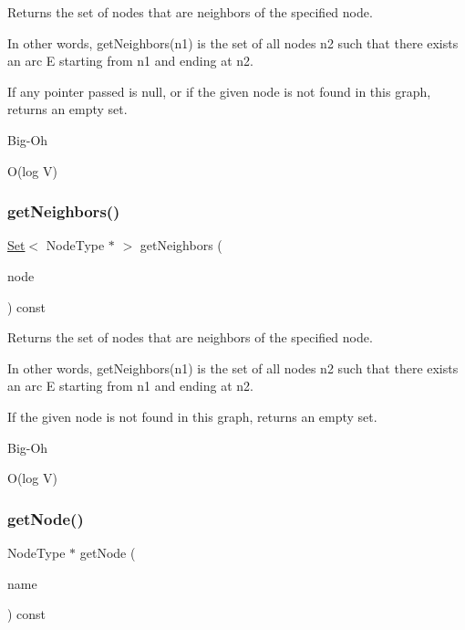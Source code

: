 Returns the set of nodes that are neighbors of the specified node. 

In other words, get\+Neighbors(n1) is the set of all nodes n2 such that there exists an arc E starting from n1 and ending at n2.

If any pointer passed is null, or if the given node is not found in this graph, returns an empty set. \begin{DoxyRefDesc}{Big-\/\+Oh}
\item[\mbox{\hyperlink{BigOh__BigOh000073}{Big-\/\+Oh}}]O(log V) \end{DoxyRefDesc}
\mbox{\label{classGraph_a3a3720906c380f36b50530419330bfe5}} 
\subsubsection{\texorpdfstring{get\+Neighbors()}{getNeighbors()}\hspace{0.1cm}{\footnotesize\ttfamily [2/2]}}
{\footnotesize\ttfamily \mbox{\hyperlink{classstanfordcpplib_1_1collections_1_1GenericSet}{Set}}$<$ Node\+Type $\ast$ $>$ get\+Neighbors (\begin{DoxyParamCaption}\item[{const std\+::string \&}]{node }\end{DoxyParamCaption}) const}



Returns the set of nodes that are neighbors of the specified node. 

In other words, get\+Neighbors(n1) is the set of all nodes n2 such that there exists an arc E starting from n1 and ending at n2.

If the given node is not found in this graph, returns an empty set. \begin{DoxyRefDesc}{Big-\/\+Oh}
\item[\mbox{\hyperlink{BigOh__BigOh000074}{Big-\/\+Oh}}]O(log V) \end{DoxyRefDesc}
\mbox{\label{classGraph_a81487976cf0e576047333c85463c33aa}} 
\subsubsection{\texorpdfstring{get\+Node()}{getNode()}}
{\footnotesize\ttfamily Node\+Type $\ast$ get\+Node (\begin{DoxyParamCaption}\item[{const std\+::string \&}]{name }\end{DoxyParamCaption}) const}



